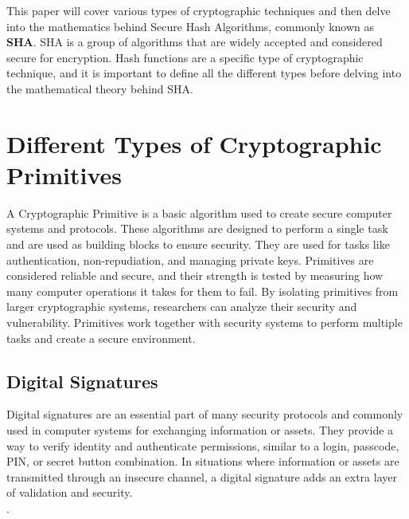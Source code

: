 \documentclass[12pt]{extarticle}
\begin{document}
This paper will cover various types of cryptographic techniques and then delve into the mathematics behind Secure Hash Algorithms, commonly known as \textbf{SHA}. SHA is a group of algorithms that are widely accepted and considered secure for encryption. Hash functions are a specific type of cryptographic technique, and it is important to define all the different types before delving into the mathematical theory behind SHA.




\section{Different Types of Cryptographic Primitives}

A Cryptographic Primitive is a basic algorithm used to create secure computer systems and protocols. These algorithms are designed to perform a single task and are used as building blocks to ensure security. They are used for tasks like authentication, non-repudiation, and managing private keys. Primitives are considered reliable and secure, and their strength is tested by measuring how many computer operations it takes for them to fail. By isolating primitives from larger cryptographic systems, researchers can analyze their security and vulnerability. Primitives work together with security systems to perform multiple tasks and create a secure environment.\cite{src7}

\subsection{Digital Signatures}
Digital signatures are an essential part of many security protocols and commonly used in computer systems for exchanging information or assets. They provide a way to verify identity and authenticate permissions, similar to a login, passcode, PIN, or secret button combination. In situations where information or assets are transmitted through an insecure channel, a digital signature adds an extra layer of validation and security.\cite{src7}\cite{src9}\\
.
\end{document}
